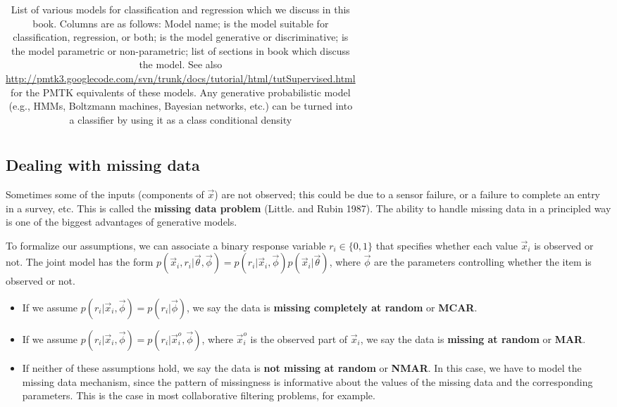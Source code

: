 \begin{table*}
\begin{tabular}{lllll}
\end{tabular}
\caption{List of various models for classification and regression which we discuss in this book. Columns are as follows: Model name; is the model suitable for classification, regression, or both; is the model generative or discriminative; is the model parametric or non-parametric; list of sections in book which discuss the model. See also \url{http://pmtk3.googlecode.com/svn/trunk/docs/tutorial/html/tutSupervised.html} for the PMTK equivalents of these models. Any generative probabilistic model (e.g., HMMs, Boltzmann machines, Bayesian networks, etc.) can be turned into a classifier by using it as a class conditional density}
\label{tab:List-of-various-models-for-classification}
\end{table*}


\subsection{Dealing with missing data}
\label{sec:Dealing-with-missing-data}
Sometimes some of the inputs (components of $\vec{x}$) are not observed; this could be due to a sensor failure, or a failure to complete an entry in a survey, etc. This is called the \textbf{missing data problem} (Little. and Rubin 1987). The ability to handle missing data in a principled way is one of the biggest advantages of generative models.

To formalize our assumptions, we can associate a binary response variable $r_i \in \{0,1\}$ that specifies whether each value $\vec{x}_i$ is observed or not. The joint model has the form $p(\vec{x}_i,r_i|\vec{\theta},\vec{\phi})=p(r_i|\vec{x}_i,\vec{\phi})p(\vec{x}_i|\vec{\theta})$, where $\vec{\phi}$ are the parameters controlling whether the item is observed or not. 
\begin{itemize}
\item{If we assume $p(r_i|\vec{x}_i,\vec{\phi})=p(r_i|\vec{\phi})$, we say the data is \textbf{missing completely at random} or \textbf{MCAR}.}
\item{If we assume $p(r_i|\vec{x}_i,\vec{\phi})=p(r_i|\vec{x}_i^o,\vec{\phi})$, where $\vec{x}_i^o$ is the observed part of $\vec{x}_i$, we say the data is \textbf{missing at random} or \textbf{MAR}.}
\item{If neither of these assumptions hold, we say the data is \textbf{not missing at random} or \textbf{NMAR}. In this case, we have to model the missing data mechanism, since the pattern of missingness is informative about the values of the missing data and the corresponding parameters. This is the case in most collaborative filtering problems, for example.}
\end{itemize}

